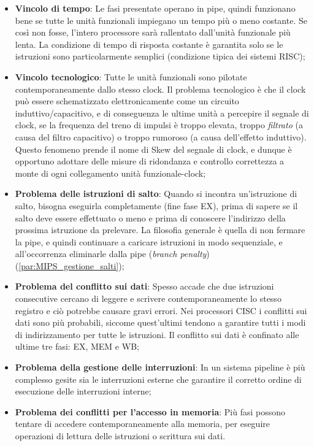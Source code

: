\begin{itemize}
    \item \textbf{Vincolo di tempo}: Le fasi presentate operano in pipe, quindi funzionano bene se tutte le unità funzionali impiegano un tempo più o meno costante. Se così non fosse, l'intero processore sarà rallentato dall'unità funzionale più lenta. La condizione di tempo di risposta costante è garantita solo se le istruzioni sono particolarmente semplici (condizione tipica dei sistemi RISC);
    \item \textbf{Vincolo tecnologico}: Tutte le unità funzionali sono pilotate contemporaneamente dallo stesso clock. Il problema tecnologico è che il clock può essere schematizzato elettronicamente come un circuito induttivo/capacitivo, e di conseguenza le ultime unità a percepire il segnale di clock, se la frequenza del treno di impulsi è troppo elevata, troppo \textit{filtrato} (a causa del filtro capacitivo) o troppo rumoroso (a causa dell'effetto induttivo). Questo fenomeno prende il nome di Skew del segnale di clock, e dunque è opportuno adottare delle misure di ridondanza e controllo correttezza a monte di ogni collegamento unità funzionale-clock;
    \item \textbf{Problema delle istruzioni di salto}: Quando si incontra un'istruzione di salto, bisogna eseguirla completamente (fine fase EX), prima di sapere se il salto deve essere effettuato o meno e prima di conoscere l'indirizzo della prossima istruzione da prelevare. La filosofia generale è quella di non fermare la pipe, e quindi continuare a caricare istruzioni in modo sequenziale, e all'occorrenza eliminarle dalla pipe (\textit{branch penalty}) (\ref{par:MIPS_gestione_salti});
    \item \textbf{Problema del conflitto sui dati}: Spesso accade che due istruzioni consecutive cercano di leggere e scrivere contemporaneamente lo stesso registro e ciò potrebbe causare gravi errori. Nei processori CISC i conflitti sui dati sono più probabili, siccome quest’ultimi tendono a garantire tutti i modi di indirizzamento per tutte le istruzioni. Il conflitto sui dati è confinato alle ultime tre fasi: EX, MEM e WB;
    \item \textbf{Problema della gestione delle interruzioni}: In un sistema pipeline è più complesso gesite sia le interruzioni esterne che garantire il corretto ordine di esecuzione delle interruzioni interne;
    \item \textbf{Problema dei conflitti per l'accesso in memoria}: Più fasi possono tentare di accedere contemporaneamente alla memoria, per eseguire operazioni di lettura delle istruzioni o scrittura sui dati. 
\end{itemize}

